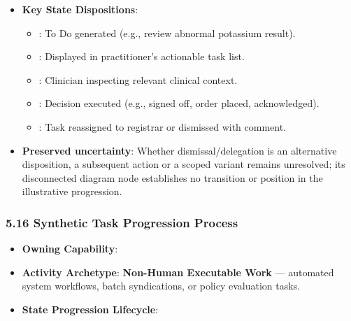 \begin{itemize}

\item
\textbf{Key State Dispositions}:


\begin{itemize}

\item
\texttt{}: To Do generated (e.g., review abnormal potassium result).



\item
\texttt{}: Displayed in practitioner's actionable task list.



\item
\texttt{}: Clinician inspecting relevant clinical context.



\item
\texttt{}: Decision executed (e.g., signed off, order placed, acknowledged).



\item
\texttt{}: Task reassigned to registrar or dismissed with comment.



\end{itemize}


\item
\textbf{Preserved uncertainty}: Whether dismissal/\allowbreak{}delegation is an alternative disposition, a subsequent action or a scoped variant remains unresolved; its disconnected diagram node establishes no transition or position in the illustrative progression.



\end{itemize}
\label{rad:processes:320}

\par\smallskip
{}\label{rad:processes:322}
\subsubsection*{5.16 Synthetic Task Progression Process}
\label{rad:processes:323}

\begin{itemize}

\item
\textbf{Owning Capability}: \texttt{}



\item
\textbf{Activity Archetype}: \textbf{Non-Human Executable Work} — automated system workflows, batch syndications, or policy evaluation tasks.



\item
\textbf{State Progression Lifecycle}:



\end{itemize}
\label{rad:processes:327}

